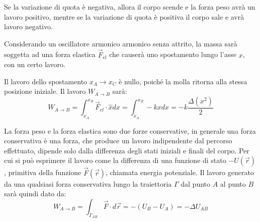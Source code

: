 \documentclass{article}
\numberwithin{equation}{subsection}
\begin{document}
Se la variazione di quota è negativa, allora il corpo 
scende e la forza peso avrà un lavoro positivo, mentre 
se la variazione di quota è positiva il corpo sale e avrà 
lavoro negativo.

\begin{center}\end{center}




Considerando un oscillatore armonico armonico senza attrito, la massa 
sarà soggetta ad una forza elastica $\vec{F}_{el}$ che causerà uno 
spostamento lungo l'asse $x$, con un certo lavoro.
\begin{center}\end{center} 
Il lavoro dello spostamento $x_A\to x_C$ è nullo, poiché la molla 
ritorna alla stessa posizione iniziale.  
Il lavoro $W_{A\to B}$ sarà:
\begin{equation}
    W_{A\to B}=\displaystyle\int_{x_A}^{x_B}\vec{F}_{el}\cdot\hat{x}dx=\int_{x_A}^{x_B}-kxdx=-k\frac{\Delta( x^{2})}{2}
\end{equation}

La forza peso e la forza elastica sono due forze conservative, in 
generale una forza conservativa è una forza, che produce un lavoro 
indipendente dal percorso effettuato, dipende solo dalla differenza degli stati iniziali 
e finali del corpo. Per cui si può esprimere il lavoro come la differenza di una funzione di stato $-U(\vec{r})$, primitiva della funzione $\vec{F}(\vec{r})$, 
chiamata energia potenziale. Il lavoro generato da una qualsiasi forza conservativa lungo 
la traiettoria $\Gamma$ dal punto $A$ al punto $B$ sarà quindi dato da: 
\begin{equation}
    W_{A\to B}=\displaystyle\int_{\Gamma_{AB}}\vec{F}\cdot d\vec{r}=-\left(U_B-U_A\right)=-\Delta U_{AB}
\end{equation}
\end{document}
